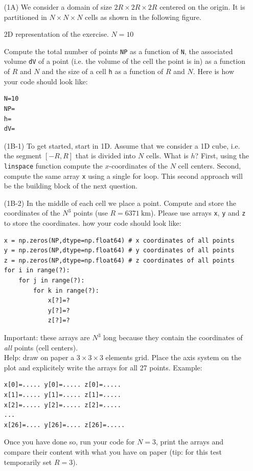 \begin{itemize}
\item[(1A)] We consider a domain of size $2R\times 2R \times 2R$ centered on the origin. It is 
partitioned in $N\times N \times N$ cells as shown in the following figure.

\begin{center}

{\captionfont 2D representation of the exercise. $N=10$}
\end{center}

Compute the total number of points {\tt NP} as a function of {\tt N},
the associated volume {\tt dV} of a point (i.e. the volume of the cell the point is in) 
as a function of $R$ and $N$ and  
the size of a cell {\tt h} as a function of $R$ and $N$. Here is 
how your code should look like:
\begin{lstlisting}
N=10
NP=
h=
dV=
\end{lstlisting}

\item[(1B-1)] To get started, start in 1D. Assume that we consider a 1D cube, i.e. the
segment $[-R,R]$ that is divided into $N$ cells. What is $h$?
First, using the {\tt linspace} function compute the $x$-coordinates of the $N$
cell centers. 
Second, compute the same array {\tt x} using a single for loop. 
This second approach will be the building block of the next question.

\item[(1B-2)] 
In the middle of each cell we place a point. Compute and store the coordinates 
of the $N^3$ points (use $R=6371~\si{\kilo\metre}$). Please use 
arrays {\tt x}, {\tt y} and {\tt z} to store the coordinates.
how your code should look like:
\begin{lstlisting}
x = np.zeros(NP,dtype=np.float64) # x coordinates of all points
y = np.zeros(NP,dtype=np.float64) # y coordinates of all points
z = np.zeros(NP,dtype=np.float64) # z coordinates of all points
for i in range(?):
    for j in range(?):
        for k in range(?):
            x[?]=?
            y[?]=?
            z[?]=?
\end{lstlisting}

Important: these arrays are $N^3$ long because they contain the coordinates 
of {\it all} points (cell centers).\\
Help: draw on paper a $3\times3\times3$ elements grid. Place the axis system 
on the plot and explicitely write the arrays for all 27 points. Example:
\begin{verbatim}
x[0]=..... y[0]=..... z[0]=.....
x[1]=..... y[1]=..... z[1]=.....
x[2]=..... y[2]=..... z[2]=.....
...
x[26]=.... y[26]=.... z[26]=.....
\end{verbatim}
Once you have done so, run your code for $N=3$, print the arrays and 
compare their content with what you 
have on paper (tip: for this test temporarily set $R=3$).



\end{itemize}
